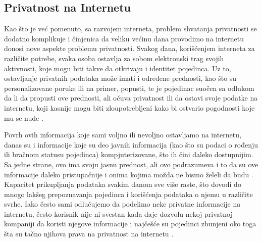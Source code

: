 \documentclass[a4paper]{article}
\begin{document}
\subsection{Privatnost na Internetu}
\label{subsec:privatnostNaInternetu}
Kao što je već pomenuto, sa razvojem interneta, problem shvatanja privatnosti se dodatno komplikuje  i činjenica  da  veliku  većinu  dana  provodimo  na  internetu  donosi nove  aspekte  problemu  privatnosti. Svakog  dana, korišćenjem interneta za različite potrebe, svaka osoba ostavlja za sobom elektronski trag svojih aktivnosti, koje mogu biti takve da otkrivaju i identitet pojedinca. Uz to, ostavljanje privatnih podataka može imati i određene prednosti, kao što su personalizovane poruke ili na primer, popusti, te je pojedinac suočen sa odlukom da li da propusti ove prednosti, ali očuva privatnost ili da ostavi svoje podatke na internetu, koji kasnije mogu biti zloupotrebljeni kako bi ostvario pogodnosti koje mu se nude \cite{renata}.
\par Povrh ovih informacija koje sami voljno ili nevoljno ostavljamo na internetu, danas su i informacije koje su deo javnih informacija (kao što su podaci o rođenju ili bračnom statusu pojedinca) kompjuterizovane, što ih čini daleko dostupnijim. Sa jedne strane, ovo ima svoju jasnu prednost, ali ovo podrazumeva i to da su ove informacije daleko pristupačnije i onima kojima možda ne bismo želeli da budu \cite{ethics}. Kapacitet prikupljanja podataka svakim danom sve više raste, što dovodi  do mnogo lakšeg prepoznavanja pojedinca i korišćenja podataka o njemu u različite svrhe. Iako često sami odlučujemo da podelimo neke privatne informacije na internetu, često korisnik nije ni svestan kada daje dozvolu nekoj privatnoj kompaniji da koristi njegove informacije i najčešće su pojedinci zbunjeni oko toga šta su tačno njihova prava na privatnost na internetu \cite{renata}.
\end{document}
